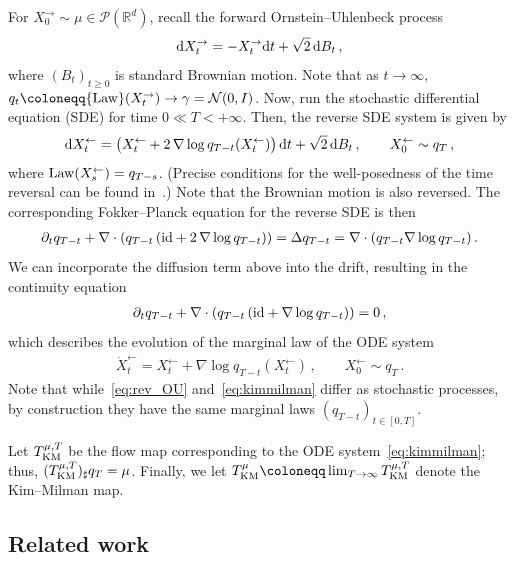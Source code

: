 \documentclass[12pt]{article}
\newcommand{\cN}{\mathcal{N}}
\newcommand{\cP}{\mathcal{P}}
\newcommand{\RR}{\mathbb{R}}
\newcommand{\R}{\RR}
\newcommand{\1}{\mathds{1}}
\newcommand{\deq}{\coloneqq}
\theoremstyle{plain}
\theoremstyle{definition}
\theoremstyle{remark}
\begin{document}
For ${X}^{\rightarrow}_0 \sim \mu \in \cP(\R^d)$, recall the forward Ornstein--Uhlenbeck process
\begin{align*}
    {\rm d}{X}^{\rightarrow}_t = -{X}^{\rightarrow}_t {\rm d}t + \sqrt{2}\,{\rm d}B_t\,,
\end{align*}
where $(B_t)_{t\ge 0}$ is standard Brownian motion. Note that as $t\to\infty$, $q_t \deq {\rm Law}(X_t^{\rightarrow})\to\gamma = \cN(0,I)$. Now, run the stochastic differential equation (SDE) for time $0 \ll T < +\infty$. Then, the reverse SDE system is given by
\begin{align}\label{eq:rev_OU}
    {\rm d}{X}^{\leftarrow}_t = \bigl({X}^{\leftarrow}_t + 2\, \nabla \log q_{T-t}({X}^{\leftarrow}_t)\bigr)\,{\rm d}t + \sqrt{2}\,{\rm d}B_t\,, \qquad X_0^\leftarrow \sim q_T\,,
\end{align}
where ${\rm Law}(X^\leftarrow_s) = q_{T-s}$.
(Precise conditions for the well-posedness of the time reversal can be found in~\cite{Cat+23TimeReversal}.)
Note that the Brownian motion is also reversed. The corresponding Fokker--Planck equation for the reverse SDE is then
\begin{align*}
\partial_t q_{T-t} + \nabla\cdot(q_{T-t}\, ({\rm{id}} + 2\, \nabla \log q_{T-t})) = \Delta q_{T-t} = \nabla \cdot(q_{T-t} \nabla \log q_{T-t})\,.
\end{align*}
We can incorporate the diffusion term above into the drift, resulting in the continuity equation
\begin{align*}
\partial_t q_{T-t} + \nabla\cdot(q_{T-t}\, ({\rm{id}} +  \nabla \log q_{T-t})) = 0\,,
\end{align*}
which describes the evolution of the marginal law of the ODE system
\begin{align}\label{eq:kimmilman}
    \dot X^{\leftarrow}_t = {X}^{\leftarrow}_t + \nabla \log q_{T-t}({X}^{\leftarrow}_t)\,, \qquad X_0^\leftarrow \sim q_T\,.
\end{align}
Note that while~\eqref{eq:rev_OU} and~\eqref{eq:kimmilman} differ as stochastic processes, by construction they have the same marginal laws $(q_{T-t})_{t\in [0,T]}$.

Let $T_{\rm KM}^{\mu,T}$ be the flow map corresponding to the ODE system~\eqref{eq:kimmilman}; thus, $(T_{\rm KM}^{\mu, T})_\sharp q_T = \mu$.
Finally, we let $T_{\rm KM}^\mu \deq \lim_{T\to\infty} T_{\rm KM}^{\mu,T}$ denote the Kim--Milman map.

\subsection{Related work}\label{sec:related}
\end{document}
